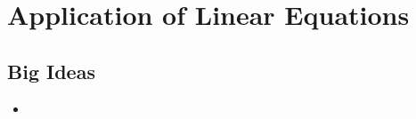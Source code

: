 \chapter{Application of Linear Equations}
\label{chap:ALE}

\section{Big Ideas}
\label{sec:ALE Big Ideas}
\begin{itemize}
  \item 
\end{itemize}